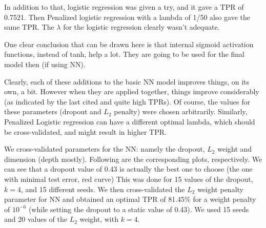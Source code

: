 \documentclass{article} %
\begin{document}
In addition to that, logistic regression was given a try, and it gave a TPR of 0.7521. Then Penalized logistic regression with a lambda of 1/50 also gave the same TPR. The $\lambda$ for the logistic regression clearly wasn’t adequate.

One clear conclusion that can be drawn here is that internal sigmoid activation functions, instead of tanh, help a lot. They are going to be used for the final model then (if using NN).

Clearly, each of these additions to the basic NN model improves things, on its own, a bit. However when they are applied together, things improve considerably (as indicated by the last cited and quite high TPRs). Of course, the values for these parameters (dropout and $L_2$ penalty) were chosen arbitrarily. Similarly, Penalized Logistic regression can have a different optimal lambda, which should be cross-validated, and might result in higher TPR. 

We cross-validated parameters for the NN: namely the dropout, $L_2$ weight and dimension (depth mostly). Following are the corresponding plots, respectively. We can see that a dropout value of 0.43 is actually the best one to choose (the one with minimal test error, red curve) This was done for 15 values of the dropout, $k=4$, and 15 different seeds. We then cross-validated the $L_2$ weight penalty parameter for NN and obtained an optimal TPR of 81.45\% for a weight penalty of $10^{-6}$ (while setting the dropout to a static value of 0.43). We used 15 seeds and 20 values of the $L_2$ weight, with $k = 4$.
\end{document}
